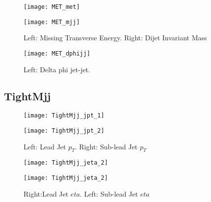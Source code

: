 \documentclass[a4paper,10pt]{article}
\begin{document}
\begin{figure}[!h]
\centering
\begin{minipage}[!h]{0.4\linewidth}
\centering
\texttt{[image: MET\_met]}
\end{minipage}%
\begin{minipage}[!h]{0.4\linewidth}
\centering
\texttt{[image: MET\_mjj]}
\end{minipage}
\caption{Left: Missing Transverse Energy. Right: Dijet Invariant Mass}
\end{figure}

\begin{figure}[!h]
\centering
\begin{minipage}[!h]{0.4\linewidth}
\centering
\texttt{[image: MET\_dphijj]}
\end{minipage}%
\begin{minipage}[!h]{0.4\linewidth}
\centering
\end{minipage}
\caption{Left: Delta phi jet-jet.}
\end{figure}

\clearpage
\subsection{TightMjj}

\begin{figure}[!h]
\centering
\begin{minipage}[!h]{0.4\linewidth}
\centering
\texttt{[image: TightMjj\_jpt\_1]}
\end{minipage}%
\begin{minipage}[!h]{0.4\linewidth}
  \texttt{[image: TightMjj\_jpt\_2]}
\end{minipage}
\caption{Left: Lead Jet $p_T$. Right: Sub-lead Jet $p_T$}
\end{figure}

\begin{figure}[!h]
\centering
\begin{minipage}[!h]{0.4\linewidth}
\centering
\texttt{[image: TightMjj\_jeta\_2]}
\end{minipage}%
\begin{minipage}[!h]{0.4\linewidth}
\centering
\texttt{[image: TightMjj\_jeta\_2]}
\end{minipage}
\caption{Right:Lead Jet $eta$. Left: Sub-lead Jet $eta$}
\end{figure}
\end{document}
